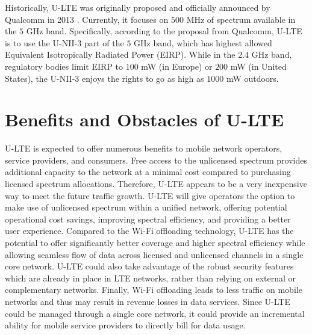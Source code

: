 Historically, U-LTE was originally proposed and officially announced by Qualcomm in 2013 \cite{Qualcomm-U-LTE-2013}. Currently, it focuses on $500$ MHz of spectrum available in the $5$ GHz band. Specifically, according to the proposal from Qualcomm, U-LTE is to use the U-NII-3 part of the $5$ GHz band, which has highest allowed Equivalent Isotropically Radiated Power (EIRP). While in the $2.4$ GHz band, regulatory bodies limit EIRP to $100$ mW (in Europe) or $200$ mW (in United States), the U-NII-3 enjoys the rights to go as high as $1000$ mW outdoors.

\section{Benefits and Obstacles of U-LTE}
\label{lte-ben}
U-LTE is expected to offer numerous benefits to mobile network operators, service providers, and consumers. Free access to the unlicensed spectrum provides additional capacity to the network at a minimal cost compared to purchasing licensed spectrum allocations. Therefore, U-LTE appears to be a very inexpensive way to meet the future traffic growth. U-LTE will give operators the option to make use of unlicensed spectrum within a unified network, offering potential operational cost savings, improving spectral efficiency, and providing a better user experience. Compared to the Wi-Fi offloading technology, U-LTE has the potential to offer significantly better coverage and higher spectral efficiency while allowing seamless flow of data across licensed and unlicensed channels in a single core network. U-LTE could also take advantage of the robust security features which are already in place in LTE networks, rather than relying on external or complementary networks. Finally, Wi-Fi offloading leads to less traffic on mobile networks and thus may result in revenue losses in data services.  Since U-LTE could be managed through a single core network, it could provide an incremental ability for mobile service providers to directly bill for data usage.

